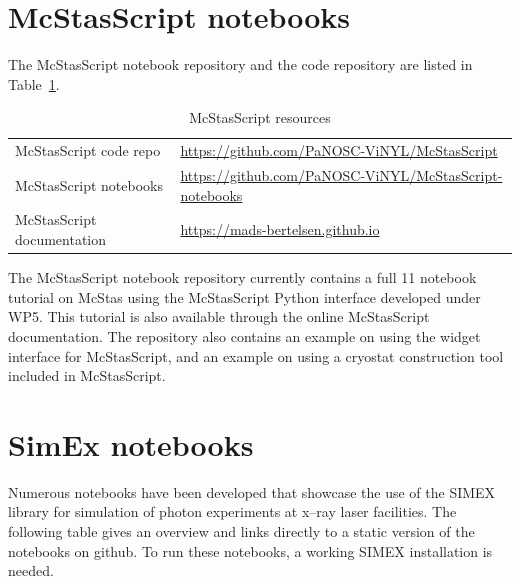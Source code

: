\documentclass[11pt, a4paper]{article}
\begin{document}
\section{McStasScript notebooks}
\label{sec:mcstas}
The McStasScript notebook repository and the code repository are listed
in Table~\ref{tab:mcstasscript_resources}.
\begin{table}[ht]
  \centering
  \caption{McStasScript resources}
  \begin{center}
    \begin{tabular}{ll}
      \hline
      McStasScript code repo  & \url{https://github.com/PaNOSC-ViNYL/McStasScript} \\ 
      McStasScript notebooks & \url{https://github.com/PaNOSC-ViNYL/McStasScript-notebooks} \\  
      McStasScript documentation & \url{https://mads-bertelsen.github.io}\\
      \hline
    \end{tabular}
  \end{center}
  \label{tab:mcstasscript_resources}
\end{table}
The McStasScript notebook repository currently contains a full 11 notebook
tutorial on McStas using the McStasScript Python interface developed under WP5.
This tutorial is also available through the online McStasScript documentation.
The repository also contains an example on using the widget interface for
McStasScript, and an example on using a cryostat construction tool included in
McStasScript.

\section{SimEx notebooks}
\label{sec:simex}
Numerous notebooks have been developed that showcase the use of the SIMEX
library for simulation of photon experiments at x--ray laser facilities. The
following table gives an overview and links directly to a static version of the
notebooks on github. 
To run these notebooks, a working SIMEX installation is needed.
\end{document}
